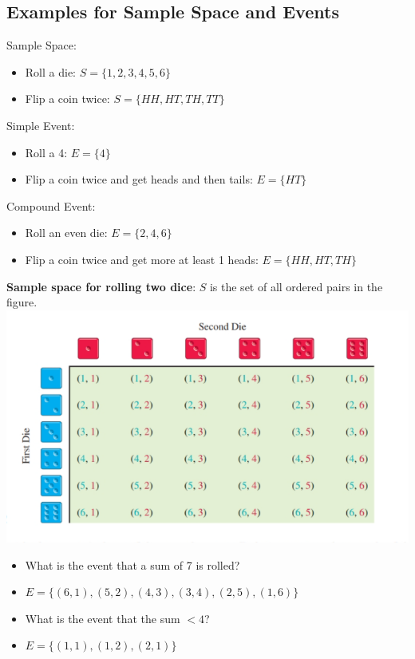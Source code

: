 \documentclass[14pt]{extarticle}
\begin{document}
\subsection{Examples for Sample Space and Events}
Sample Space:
\begin{itemize}
	\item Roll a die: $S=\{1,2,3,4,5,6\}$
	\item Flip a coin twice: $S=\{HH,HT,TH, TT\}$
\end{itemize}
Simple Event:
\begin{itemize}
	\item Roll a 4: $E=\{4\}$
	\item Flip a coin twice and get heads and then tails: $E=\{HT\}$
\end{itemize}
Compound Event:
\begin{itemize}
	\item Roll an even die: $E=\{2,4,6\}$
	\item Flip a coin twice and get more at least 1 heads: $E=\{HH,HT,TH\}$
\end{itemize}
\vspace{5ex}
\textbf{Sample space for rolling two dice}: $S$ is the set of all ordered pairs in the figure.\\
\includegraphics[width=0.9\linewidth]{8-1-5}
\begin{itemize}
	\item What is the event that a sum of 7 is rolled?
	\item $E = \{(6,1), (5,2),(4,3),(3,4),(2,5),(1,6)\}$
	\item What is the event that the sum $<4$?
	\item $E=\{(1,1),(1,2),(2,1)\}$
\end{itemize}
\end{document}
